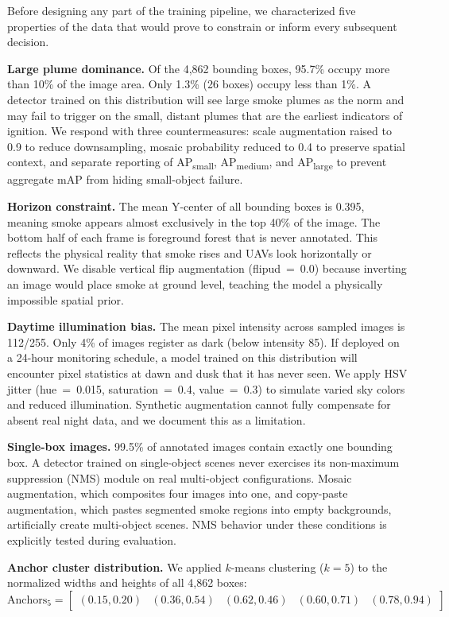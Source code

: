 \documentclass[10pt,twocolumn]{article}
\begin{document}
Before designing any part of the training pipeline, we characterized five properties of the data that would prove to constrain or inform every subsequent decision.

\textbf{Large plume dominance.} Of the 4,862 bounding boxes, 95.7\% occupy more than 10\% of the image area. Only 1.3\% (26 boxes) occupy less than 1\%. A detector trained on this distribution will see large smoke plumes as the norm and may fail to trigger on the small, distant plumes that are the earliest indicators of ignition. We respond with three countermeasures: scale augmentation raised to 0.9 to reduce downsampling, mosaic probability reduced to 0.4 to preserve spatial context, and separate reporting of AP\textsubscript{small}, AP\textsubscript{medium}, and AP\textsubscript{large} to prevent aggregate mAP from hiding small-object failure.

\textbf{Horizon constraint.} The mean Y-center of all bounding boxes is 0.395, meaning smoke appears almost exclusively in the top 40\% of the image. The bottom half of each frame is foreground forest that is never annotated. This reflects the physical reality that smoke rises and UAVs look horizontally or downward. We disable vertical flip augmentation (flipud~=~0.0) because inverting an image would place smoke at ground level, teaching the model a physically impossible spatial prior.

\textbf{Daytime illumination bias.} The mean pixel intensity across sampled images is 112/255. Only 4\% of images register as dark (below intensity 85). If deployed on a 24-hour monitoring schedule, a model trained on this distribution will encounter pixel statistics at dawn and dusk that it has never seen. We apply HSV jitter (hue~=~0.015, saturation~=~0.4, value~=~0.3) to simulate varied sky colors and reduced illumination. Synthetic augmentation cannot fully compensate for absent real night data, and we document this as a limitation.

\textbf{Single-box images.} 99.5\% of annotated images contain exactly one bounding box. A detector trained on single-object scenes never exercises its non-maximum suppression (NMS) module on real multi-object configurations. Mosaic augmentation, which composites four images into one, and copy-paste augmentation, which pastes segmented smoke regions into empty backgrounds, artificially create multi-object scenes. NMS behavior under these conditions is explicitly tested during evaluation.

\textbf{Anchor cluster distribution.} We applied \(k\)-means clustering (\(k=5\)) to the normalized widths and heights of all 4,862 boxes:
\begin{equation}
\text{Anchors}_5 = \begin{bmatrix}
(0.15, 0.20) & (0.36, 0.54) & (0.62, 0.46) & (0.60, 0.71) & (0.78, 0.94)
\end{bmatrix}
\label{eq:anchors}
\end{equation}
\end{document}
